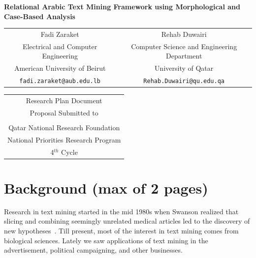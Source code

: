 \documentclass[12pt]{article}
\begin{document}
\pagestyle{fancy}
\chead{}

\cfoot{}
\renewcommand{\footrulewidth}{0.2pt}
\renewcommand{\headrulewidth}{0.2pt}


\begin{center}
{\Large \bf Relational Arabic Text Mining Framework using 
    Morphological
    and Case-Based Analysis }

\vspace{1.5in}

\renewcommand{\arraystretch}{.6}
\begin{tabular}{cc}
Fadi Zaraket & Rehab Duwairi \\
Electrical and Computer Engineering &  Computer Science and Engineering Department \\
American University of Beirut & University of Qatar \\
{\tt fadi.zaraket@aub.edu.lb} & {\tt Rehab.Duwairi@qu.edu.qa}
\end{tabular}

\vspace{1.5in}

\renewcommand{\arraystretch}{.6}
\begin{tabular}{c}
{\small Research Plan Document } \\
{\small Proposal Submitted to }\\
\\
    Qatar National Research Foundation \\
    National Priorities Research Program \\
    4$^{th}$ Cycle 
\end{tabular}
\vspace{.5in}

\date{\today}
\pagebreak

\end{center}

\section{Background (max of 2 pages)}
\label{s:background}

Research in text mining started in the mid 1980s when Swanson 
realized that slicing and combining seemingly unrelated medical 
articles led to the discovery of new 
hypotheses~\cite{JNi06}.
Till present, most of the interest in text mining comes 
from biological sciences.
Lately we saw applications of text mining in the advertisement, 
political campaigning, and other businesses.
\end{document}
